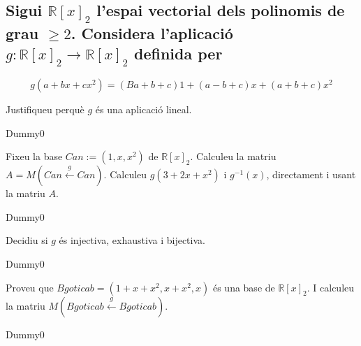 \documentclass[a4paper, 12pt]{article}
\begin{document}
    \subsection{Sigui $\mathbb{R}[x]_2$ l'espai vectorial dels polinomis de grau $\geq 2$.
    Considera l'aplicació $g: \mathbb{R}[x]_2 \rightarrow \mathbb{R}[x]_2$ definida per}
    \begin{displaymath}
        g(a+bx+cx^2) = (Ba+b+c)1 + (a-b+c)x + (a+b+c)x^2
    \end{displaymath}
    \begin{exercici}
        Justifiqueu perquè $g$ és una aplicació lineal.
    \end{exercici}
    \begin{solucio}
        Dummy0
    \end{solucio}
    \begin{exercici}
        Fixeu la base $Can := (1, x, x^2)$ de $\mathbb{R}[x]_2$. Calculeu la matriu $A = M(Can \xleftarrow{g} Can)$.
        Calculeu $g(3+2x+x^2)$ i $g^{-1}(x)$, directament i usant la matriu $A$. 
    \end{exercici}
    \begin{solucio}
        Dummy0
    \end{solucio}
    \begin{exercici}
        Decidiu si $g$ és injectiva, exhaustiva i bijectiva.
    \end{exercici}
    \begin{solucio}
        Dummy0
    \end{solucio}
    \begin{exercici}
        Proveu que $Bgoticab = (1 + x + x^2, x + x^2, x)$ és una base de $\mathbb{R}[x]_2$. I
        calculeu la matriu $M(Bgoticab \xleftarrow{g} Bgoticab)$.
    \end{exercici}
    \begin{solucio}
        Dummy0
    \end{solucio}
\end{document}
